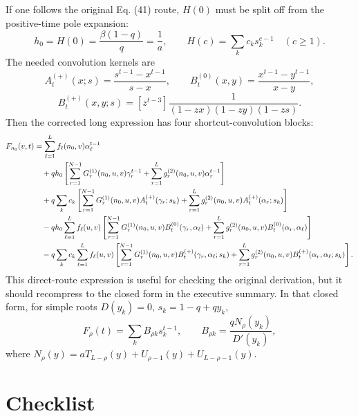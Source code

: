 \documentclass[11pt]{article}
\begin{document}
If one follows the original Eq. (41) route, \(H(0)\) must be split off from the
positive-time pole expansion:
\[
  h_0=H(0)=\frac{\beta(1-q)}q=\frac1a,
  \qquad H(c)=\sum_k c_k s_k^{c-1}\quad(c\geq1).
\]
The needed convolution kernels are
\[
  A^{(+)}_t(x;s)=\frac{s^{t-1}-x^{t-1}}{s-x},
  \qquad
  B^{(0)}_t(x,y)=\frac{x^{t-1}-y^{t-1}}{x-y},
\]
\[
  B^{(+)}_t(x,y;s)=
  [z^{t-3}]\frac{1}{(1-zx)(1-zy)(1-zs)}.
\]
Then the corrected long expression has four shortcut-convolution blocks:
\begin{align}
F_{n_0}(v,t)
&=
\sum_{\ell=1}^{L}f_\ell(n_0,v)\alpha_\ell^{t-1} \notag\\
&\quad
+qh_0
\left[
\sum_{r=1}^{N-1}G^{(1)}_r(n_0,u,v)\gamma_r^{t-1}
+
\sum_{r=1}^{L}g^{(2)}_r(n_0,u,v)\alpha_r^{t-1}
\right]\notag\\
&\quad
+q\sum_k c_k
\left[
\sum_{r=1}^{N-1}G^{(1)}_r(n_0,u,v)A^{(+)}_t(\gamma_r;s_k)
+
\sum_{r=1}^{L}g^{(2)}_r(n_0,u,v)A^{(+)}_t(\alpha_r;s_k)
\right]\notag\\
&\quad
-qh_0\sum_{\ell=1}^{L}f_\ell(u,v)
\left[
\sum_{r=1}^{N-1}G^{(1)}_r(n_0,u,v)B^{(0)}_t(\gamma_r,\alpha_\ell)
+
\sum_{r=1}^{L}g^{(2)}_r(n_0,u,v)B^{(0)}_t(\alpha_r,\alpha_\ell)
\right]\notag\\
&\quad
-q\sum_k c_k\sum_{\ell=1}^{L}f_\ell(u,v)
\left[
\sum_{r=1}^{N-1}G^{(1)}_r(n_0,u,v)B^{(+)}_t(\gamma_r,\alpha_\ell;s_k)
+
\sum_{r=1}^{L}g^{(2)}_r(n_0,u,v)B^{(+)}_t(\alpha_r,\alpha_\ell;s_k)
\right].
\label{eq:correct-hard-route}
\end{align}
This direct-route expression is useful for checking the original derivation, but
it should recompress to the closed form in the executive summary.  In that
closed form, for simple roots \(D(y_k)=0\), \(s_k=1-q+qy_k\),
\[
\boxed{
F_\rho(t)=\sum_k B_{\rho k}s_k^{t-1},
\qquad
B_{\rho k}=\frac{qN_\rho(y_k)}{D'(y_k)},}
\]
where \(N_\rho(y)=aT_{L-\rho}(y)+U_{\rho-1}(y)+U_{L-\rho-1}(y)\).

\section*{Checklist}
\end{document}

